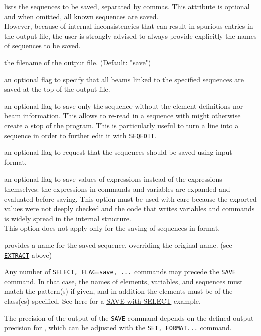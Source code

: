 \begin{5.02.07}
\begin{madlist}
	 lists the sequences to be saved, separated by commas. 
	This attribute is optional and when omitted, all known 
	sequences are saved. \\
	However, because of internal inconsistencies that can result in spurious 
	entries in the output file, the user is strongly advised to always provide 
	explicitly the names of sequences to be saved.

	 the filename of the output file. (Default: "save")

	 an optional flag to specify that all beams linked to the
	specified sequences are saved at the top of the output file.

	 an optional flag to save only the sequence without the
	element definitions nor beam information. This allows to re-read in a
	sequence with might otherwise create a stop of the program. This is
	particularly useful to turn a line into a sequence in order to further edit 
	it with \hyperref[sec:seqedit]{\tt SEQEDIT}.

	 an optional flag to request that the sequences should be  
	saved using \madeight input format.

	 an optional flag to save values of expressions 
	instead of the expressions themselves: the expressions in commands 
	and variables are expanded and evaluated before saving.
	This option must be used with care because the exported values were not deeply
	checked and the code that writes variables and commands is widely spread
	in the internal structure. \\
	This option does not apply only for the saving of sequences in \madeight format. 

	 provides a name for the saved sequence, overriding the 
	original name. (see \hyperref[sec:extract]{\tt EXTRACT} above)
\end{madlist}
\end{5.02.07}


Any number of {\tt SELECT, FLAG=save, ...} commands may precede
the {\tt SAVE} command. In that case, the names of elements, variables, and
sequences must match the pattern(s) if given, and in addition the
elements must be of the class(es) specified. 
See here for a
\href{../Introduction/select.html#save_select}{SAVE with SELECT}
example.  

The precision of the output of the {\tt SAVE} command depends on the defined 
output precision for \madx, which can be adjusted with the 
\hyperref[sec:set]{\tt SET, FORMAT...} command.

